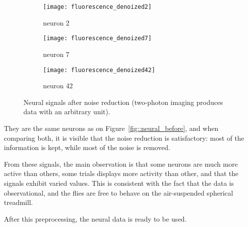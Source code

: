 \begin{figure}[H]
	\begin{subfigure}[h]{0.6\textwidth}
		\begin{center}
			\texttt{[image: fluorescence\_denoized2]}
			\caption{neuron 2}
		\end{center}
	\end{subfigure}
	
	\begin{subfigure}[h]{0.6\textwidth}
		\begin{center}
			\texttt{[image: fluorescence\_denoized7]}
			\caption{neuron 7}
		\end{center}
	\end{subfigure}
	
	\begin{subfigure}[h]{0.6\textwidth}
		\begin{center}
			\texttt{[image: fluorescence\_denoized42]}
			\caption{neuron 42}
		\end{center}
	\end{subfigure}
	\caption{Neural signals after noise reduction (two-photon imaging produces data with an arbitrary unit).}
	\label{fig::neural_after}
\end{figure}

They are the same neurons as on Figure~\ref{fig::neural_before}, and when comparing both, it is visible that the noise reduction is satisfactory: most of the information is kept, while most of the noise is removed.

From these signals, the main observation is that some neurons are much more active than others, some trials displays more activity than other, and that the signals exhibit varied values.
This is consistent with the fact that the data is observational, and the flies are free to behave on the air-suspended spherical treadmill.

\vspace{\baselineskip}

After this preprocessing, the neural data is ready to be used.

\newpage
